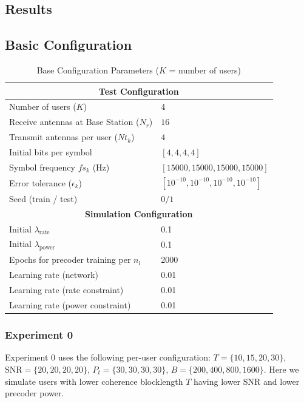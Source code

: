 \documentclass[a4paper, 12pt, onecolumn, journal, twoside, draftclsnofoot]{IEEEtran}
\begin{document}
\subsection{Results}


\subsection*{Basic Configuration}

\begin{table}[H]
\centering
\caption{Base Configuration Parameters ($K$ = number of users)}
\begin{tabular}{ll}
\toprule
\multicolumn{2}{c}{\textbf{Test Configuration}} \\
\midrule
Number of users ($K$) & 4 \\
Receive antennas  at Base Station ($N_r$) & $16$ \\
Transmit antennas per user ($Nt_{k}$) & $4$ \\
Initial bits per symbol & $[4,4,4,4]$ \\
Symbol frequency $fs_k$ (Hz) & $[15000,15000,15000,15000]$ \\
Error tolerance ($\epsilon_k$) & $[10^{-10},10^{-10},10^{-10},10^{-10}]$ \\
Seed (train / test) & $0 / 1$ \\
\midrule
\multicolumn{2}{c}{\textbf{Simulation Configuration}} \\
\midrule
Initial $\lambda_{\text{rate}}$ & 0.1 \\
Initial $\lambda_{\text{power}}$ & 0.1 \\
Epochs for precoder training per $n_l$ & 2000 \\
Learning rate (network) & 0.01 \\
Learning rate (rate constraint) & 0.01 \\
Learning rate (power constraint) & 0.01 \\
\bottomrule
\end{tabular}
\end{table}

\subsubsection*{\textbf{Experiment 0}}
Experiment 0 uses the following per-user configuration:
$T=\{10,15,20,30\}$, $\mathrm{SNR}=\{20,20,20,20\}$, $P_t=\{30,30,30,30\}$, $B=\{200,400,800,1600\}$. 
Here we simulate users with lower coherence blocklength $T$ having lower SNR and lower precoder power.
\end{document}
